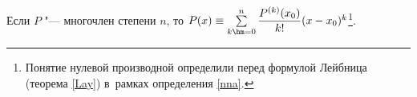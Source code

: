 
    Если $P$ "--- многочлен степени $n$, то $P(x)\equiv\sum\limits_{k\hm=0}^n\dfrac{P^{(k)}(x_0)}{k!}(x-x_0)^k$\pau\footnote{Понятие нулевой производной определили перед формулой Лейбница (теорема \ref{Lay}) в~рамках определения \ref{nna}.}.

